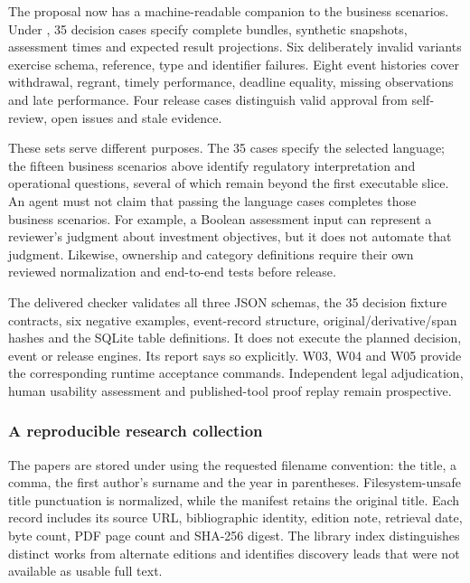 The proposal now has a machine-readable companion to the business scenarios.
Under , 35 decision cases specify complete bundles,
synthetic snapshots, assessment times and expected result projections. Six
deliberately invalid variants exercise schema, reference, type and identifier
failures. Eight event histories cover withdrawal, regrant, timely performance,
deadline equality, missing observations and late performance. Four release cases
distinguish valid approval from self-review, open issues and stale evidence.

These sets serve different purposes. The 35 cases specify the selected language;
the fifteen business scenarios above identify regulatory interpretation and
operational questions, several of which remain beyond the first executable
slice. An agent must not claim that passing the language cases completes those
business scenarios. For example, a Boolean assessment input can represent a
reviewer's judgment about investment objectives, but it does not automate that
judgment. Likewise, ownership and category definitions require their own reviewed
normalization and end-to-end tests before release.

The delivered checker validates all three JSON schemas, the 35 decision fixture
contracts, six negative examples, event-record structure, original/derivative/span
hashes and the SQLite table definitions. It does not execute the planned decision,
event or release engines. Its report says so explicitly. W03, W04 and W05 provide
the corresponding runtime acceptance commands. Independent legal adjudication,
human usability assessment and published-tool proof replay remain prospective.

\subsubsection{A reproducible research collection}

The papers are stored under  using the requested filename
convention: the title, a comma, the first author's surname and the year in
parentheses. Filesystem-unsafe title punctuation is normalized, while the manifest
retains the original title. Each
record includes its source URL, bibliographic identity, edition note, retrieval
date, byte count, PDF page count and SHA-256 digest. The library index distinguishes
distinct works from alternate editions and identifies discovery leads that were
not available as usable full text.

